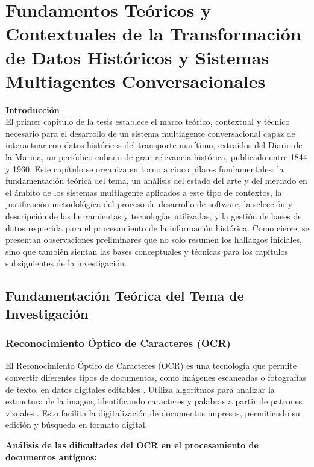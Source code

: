 \chapter{Fundamentos Teóricos y Contextuales de la Transformación de Datos Históricos y Sistemas Multiagentes Conversacionales}
\label{chap:chapter1}

\textbf{\LARGE Introducción}\\
El primer capítulo de la tesis establece el marco teórico, contextual y técnico necesario para el desarrollo de un sistema multiagente conversacional capaz de interactuar con datos históricos del transporte marítimo, extraídos del Diario de la Marina, un periódico cubano de gran relevancia histórica, publicado entre 1844 y 1960. Este capítulo se organiza en torno a cinco pilares fundamentales: la fundamentación teórica del tema, un análisis del estado del arte y del mercado en el ámbito de los sistemas multiagente aplicados a este tipo de contextos, la justificación metodológica del proceso de desarrollo de software, la selección y descripción de las herramientas y tecnologías utilizadas, y la gestión de bases de datos requerida para el procesamiento de la información histórica. Como cierre, se presentan observaciones preliminares que no solo resumen los hallazgos iniciales, sino que también sientan las bases conceptuales y técnicas para los capítulos subsiguientes de la investigación.

\section{Fundamentación Teórica del Tema de Investigación}\label{seq_0}

\subsection{Reconocimiento Óptico de Caracteres (OCR)}\label{seq_1}

El Reconocimiento Óptico de Caracteres (OCR) es una tecnología que permite convertir diferentes tipos de documentos, como imágenes escaneadas o fotografías de texto, en datos digitales editables \cite{uci2024}. Utiliza algoritmos para analizar la estructura de la imagen, identificando caracteres y palabras a partir de patrones visuales \cite{dialnet2024}. Esto facilita la digitalización de documentos impresos, permitiendo su edición y búsqueda en formato digital.

\textbf{Análisis de las dificultades del OCR en el procesamiento de documentos antiguos:}

